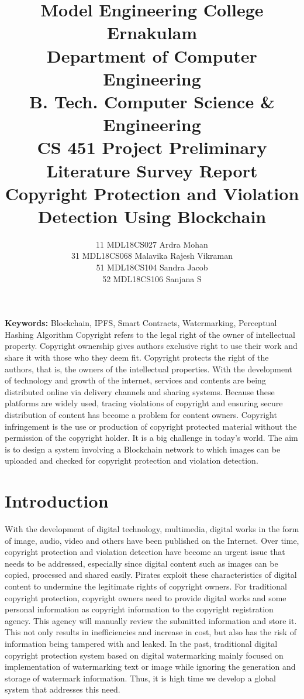 \documentclass[10pt]{article}
\title{Model Engineering College Ernakulam
\\Department of Computer Engineering
\\B. Tech. Computer Science \& Engineering 
\\CS 451 Project Preliminary
\\ Literature Survey Report
\\Copyright Protection and Violation Detection Using Blockchain
}
\author{
11 MDL18CS027 Ardra Mohan 
\\ 31 MDL18CS068 Malavika Rajesh Vikraman
\\ 51 MDL18CS104 Sandra Jacob  
\\ 52 MDL18CS106 Sanjana S }
\begin{document}
\maketitle

{\bf Keywords:} Blockchain, IPFS, Smart Contracts, Watermarking, Perceptual Hashing Algorithm
\abstract{}
Copyright refers to the legal right of the owner of intellectual property. Copyright ownership gives authors exclusive right to use their work and share it with those who they deem fit. Copyright protects the right of the authors, that is, the owners of the intellectual properties. With the development of technology and growth of the internet, services and contents are being distributed online via delivery channels and sharing systems. Because these platforms are widely used, tracing violations of copyright and ensuring secure distribution of content has become a problem for content owners. Copyright infringement is the use or production of copyright protected material without the permission of the copyright holder. It is a big challenge in today’s world. The aim is to design a system involving a Blockchain network to which images can be uploaded and checked for copyright protection and violation detection.

\section{Introduction}
With the development of digital technology, multimedia, digital works in the form of image, audio, video and others have been published on the Internet. Over time, copyright protection and violation detection  have become an urgent issue that needs to be addressed, especially since digital content such as images can be copied, processed and shared easily. Pirates exploit these characteristics of digital content to undermine the legitimate rights of copyright owners. For traditional copyright protection, copyright owners need to provide digital works and some personal information as copyright information to the copyright registration agency. This agency will manually review the submitted information and store it. This not only results in inefficiencies and increase in cost, but also has the risk of information being tampered with and leaked. In the past, traditional digital copyright protection system based on digital watermarking mainly focused on implementation of watermarking text or image while ignoring the generation and storage of watermark information. Thus, it is high time we develop a global system that addresses this need.
\end{document}
